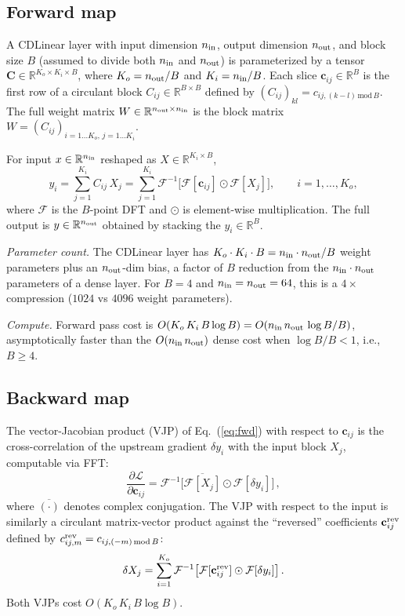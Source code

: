 \documentclass[aps,prx,onecolumn,11pt,nofootinbib,longbibliography]{revtex4-2}
\newcommand{\F}{\mathcal{F}}
\newcommand{\Real}{\mathbb{R}}
\newcommand{\loss}{\mathcal{L}}
\begin{document}
\subsection{Forward map}

A CDLinear layer with input dimension $n_{\rm in}$, output dimension
$n_{\rm out}$, and block size $B$ (assumed to divide both $n_{\rm in}$ and
$n_{\rm out}$) is parameterized by a tensor
$\mathbf{C}\in\Real^{K_o\times K_i\times B}$, where $K_o = n_{\rm out}/B$ and
$K_i = n_{\rm in}/B$.  Each slice $\mathbf{c}_{ij} \in \Real^B$ is the first
row of a circulant block $C_{ij}\in\Real^{B\times B}$ defined by
$(C_{ij})_{kl} = c_{ij,(k-l)\,\mathrm{mod}\,B}$.  The full weight matrix
$W \in \Real^{n_{\rm out}\times n_{\rm in}}$ is the block matrix
$W = (C_{ij})_{i=1\ldots K_o,\,j=1\ldots K_i}$.

For input $x \in \Real^{n_{\rm in}}$ reshaped as $X \in \Real^{K_i \times B}$,
\begin{equation}
y_i = \sum_{j=1}^{K_i} C_{ij}\,X_j
   = \sum_{j=1}^{K_i} \F^{-1}\bigl[\F[\mathbf{c}_{ij}] \odot \F[X_j]\bigr],
\qquad i = 1, \ldots, K_o,
\label{eq:fwd}
\end{equation}
where $\F$ is the $B$-point DFT and $\odot$ is element-wise multiplication.
The full output is $y\in\Real^{n_{\rm out}}$ obtained by stacking the
$y_i\in\Real^B$.

\textit{Parameter count.}  The CDLinear layer has $K_o\cdot K_i\cdot B =
n_{\rm in}\cdot n_{\rm out}/B$ weight parameters plus an $n_{\rm out}$-dim
bias, a factor of $B$ reduction from the $n_{\rm in}\cdot n_{\rm out}$
parameters of a dense layer.  For $B = 4$ and $n_{\rm in} = n_{\rm out} = 64$,
this is a $4\times$ compression ($1024$ vs $4096$ weight parameters).

\textit{Compute.}  Forward pass cost is $O(K_o\,K_i\,B\log B) =
O(n_{\rm in}\,n_{\rm out}\,\log B / B)$, asymptotically faster than the
$O(n_{\rm in}\,n_{\rm out})$ dense cost when $\log B / B < 1$, i.e.,
$B \geq 4$.

\subsection{Backward map}

The vector-Jacobian product (VJP) of Eq.~(\ref{eq:fwd}) with respect to
$\mathbf{c}_{ij}$ is the cross-correlation of the upstream gradient
$\delta y_i$ with the input block $X_j$, computable via FFT:
\begin{equation}
\frac{\partial \loss}{\partial \mathbf{c}_{ij}} =
\F^{-1}\bigl[\overline{\F[X_j]} \odot \F[\delta y_i]\bigr]\,,
\label{eq:bwd-c}
\end{equation}
where $\overline{(\cdot)}$ denotes complex conjugation.  The VJP with respect
to the input is similarly a circulant matrix-vector product against the
``reversed'' coefficients $\mathbf{c}_{ij}^{\rm rev}$ defined by
$c_{ij,m}^{\rm rev} = c_{ij,(-m)\,\mathrm{mod}\,B}$:
\begin{equation}
\delta X_j = \sum_{i=1}^{K_o} \F^{-1}\bigl[\F[\mathbf{c}_{ij}^{\rm rev}] \odot
                                           \F[\delta y_i]\bigr]\,.
\label{eq:bwd-x}
\end{equation}
Both VJPs cost $O(K_o\,K_i\,B\log B)$.
\end{document}

